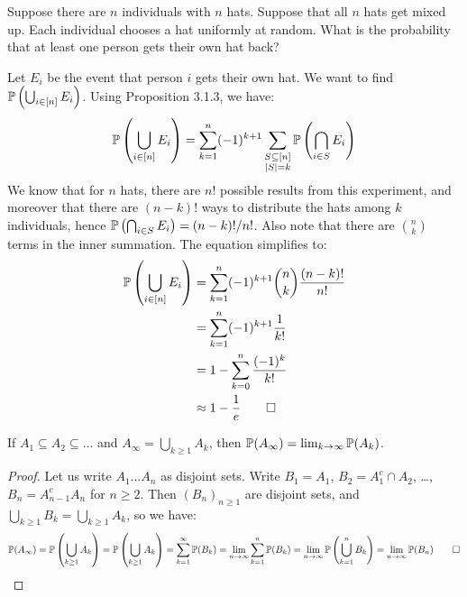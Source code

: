 \begin{example}
   Suppose there are $n$ individuals with $n$ hats. Suppose that all $n$ hats get mixed up. Each individual chooses a hat uniformly at random. What is the probability that at least one person gets their own hat back?
\end{example}
\begin{solution}
   Let $E_i$ be the event that person $i$ gets their own hat. We want to find $\mathbb{P}\left(\bigcup_{i \in [n]}E_i\right)$. Using Proposition 3.1.3, we have:
   \[ \mathbb{P}\left(\bigcup_{i \in [n]}E_i\right) = \sum_{k = 1}^{n}(-1)^{k+1}\sum_{\substack{S \subseteq [n] \\ |S| = k}}\mathbb{P}\left(\bigcap_{i \in S}E_i\right) \]
   We know that for $n$ hats, there are $n!$ possible results from this experiment, and moreover that there are $(n-k)!$ ways to distribute the hats among $k$ individuals, hence $\mathbb{P}\left(\bigcap_{i \in S}E_i\right) = (n-k)!/n!$. Also note that there are $\binom{n}{k}$ terms in the inner summation. The equation simplifies to:
   \begin{align*}
      \mathbb{P}\left(\bigcup_{i \in [n]}E_i\right) &= \sum_{k = 1}^{n}(-1)^{k+1}\binom{n}{k}\frac{(n-k)!}{n!} \\
                                             &= \sum_{k = 1}^{n}(-1)^{k+1}\frac{1}{k!} \\
                                             &= 1 - \sum_{k = 0}^{n}\frac{(-1)^k}{k!} \\
                                             &\approx 1 - \frac{1}{e} \qedhere
   \end{align*}
\end{solution}

\begin{propbox}
   If $A_1 \subseteq A_2 \subseteq \dots$ and $A_\infty = \bigcup_{k \geq 1}A_k$, then $\mathbb{P}(A_\infty) = \lim_{k \to \infty}\mathbb{P}(A_k)$. 
\end{propbox}

\begin{proof}
   Let us write $A_1 \dots A_n$ as disjoint sets. Write $B_1 = A_1$, $B_2 = A_1^c \cap A_2$, \dots, $B_n = A_{n-1}^cA_n$ for $n \geq 2$. Then $(B_n)_{n\geq1}$ are disjoint sets, and $\bigcup_{k \geq 1}B_k = \bigcup_{k \geq 1}A_k$, so we have:
   \[ \mathbb{P}(A_\infty) = \mathbb{P}\left(\bigcup_{k \geq 1}A_k \right) = \mathbb{P}\left(\bigcup_{k \geq 1}A_k \right) = \displaystyle\sum_{k = 1}^{\infty}\mathbb{P}(B_k) = \lim_{n \to \infty}\displaystyle\sum_{k = 1}^{n}\mathbb{P}(B_k) = \lim_{n\to\infty}\mathbb{P}\left(\bigcup_{k = 1}^nB_k \right) = \lim_{n\to\infty}\mathbb{P}(B_n)\qedhere \]
\end{proof}
\
